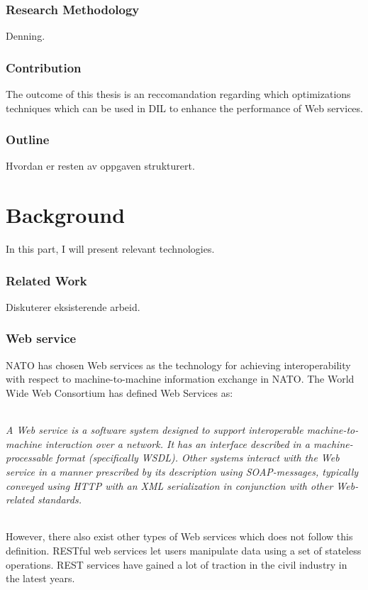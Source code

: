 \documentclass[USenglish]{article}
\begin{document}
\section{Research Methodology}
Denning.

\section{Contribution}
The outcome of this thesis is an reccomandation regarding which optimizations techniques which can be used in DIL to enhance the performance of Web services.

\section{Outline}
Hvordan er resten av oppgaven strukturert.


\part{Background}
In this part, I will present relevant technologies.
\section{Related Work}
Diskuterer eksisterende arbeid.

\section{Web service}
NATO has chosen Web services as the technology for achieving interoperability with respect to machine-to-machine information exchange in NATO. The World Wide Web Consortium has defined Web Services as\cite{wrc-web-service}:
\paragraph{}
\textit{A Web service is a software system designed to support interoperable machine-to-machine interaction over a network. It has an interface described in a machine-processable format (specifically WSDL). Other systems interact with the Web service in a manner prescribed by its description using SOAP-messages, typically conveyed using HTTP with an XML serialization in conjunction with other Web-related standards.}
\paragraph{}
However, there also exist other types of Web services which does not follow this definition. RESTful web services let users manipulate data using a set of stateless operations. REST services have gained a lot of traction in the civil industry in the latest years.
\end{document}
